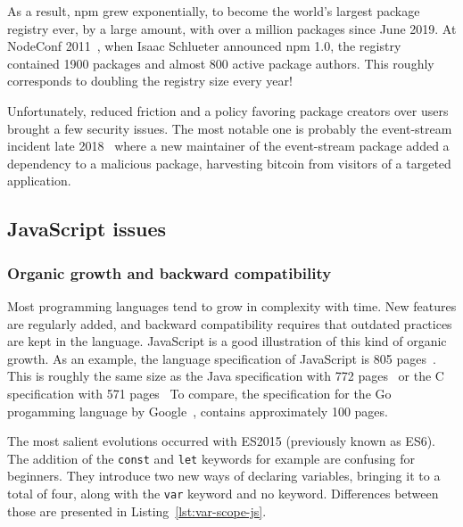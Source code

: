 
As a result, \textsf{npm} grew exponentially, to become the world's largest package
registry ever, by a large amount, with over a million packages since June 2019.
At NodeConf 2011~\cite{npm-video}, when Isaac Schlueter announced \textsf{npm} 1.0,
the registry contained 1900 packages and almost 800 active package authors.
This roughly corresponds to doubling the registry size every year!

Unfortunately, reduced friction and a policy favoring package creators over users
brought a few security issues.
The most notable one is probably the event-stream incident late 2018~\cite{npm-event-stream}
where a new maintainer of the event-stream package added a dependency
to a malicious package, harvesting bitcoin from visitors of a targeted application.


\subsection{JavaScript issues}%
\label{sub:javascript_issues}

\subsubsection{Organic growth and backward compatibility}%
\label{ssub:organic_growth_and_backward_compatibility}

Most programming languages tend to grow in complexity with time.
New features are regularly added, and backward compatibility requires that
outdated practices are kept in the language.
JavaScript is a good illustration of this kind of organic growth.
As an example, the language specification of JavaScript is 805 pages~\cite{ecmascript-pdf}.
This is roughly the same size as the Java specification with 772 pages~\cite{java-spec-pdf}
or the C specification with 571 pages~\cite{c-spec-pdf}
To compare, the specification for the Go progamming language
by Google~\cite{go-spec}, contains approximately 100 pages.


The most salient evolutions occurred with ES2015 (previously known as ES6).
The addition of the \verb|const| and \verb|let| keywords for example are confusing for beginners.
They introduce two new ways of declaring variables, bringing it to a total of four,
along with the \verb|var| keyword and no keyword.
Differences between those are presented in Listing~\ref{lst:var-scope-js}.

